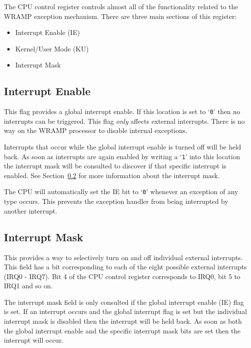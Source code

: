 \documentclass[a4paper,10pt]{article}
\begin{document}
The CPU control register controls almost all of the functionality
related to the WRAMP exception mechanism. There are three main
sections of this register:

\begin{itemize}
\item Interrupt Enable (IE)
\item Kernel/User Mode (KU)
\item Interrupt Mask
\end{itemize}

\subsection{Interrupt Enable}

This flag provides a global interrupt enable. If this location is set
to `\texttt{0}' then no interrupts can be triggered. This flag
\emph{only} affects external interrupts. There is no way on the WRAMP
processor to disable internal exceptions.

Interrupts that occur while the global interrupt enable is turned off
will be held back. As soon as interrupts are again enabled by writing
a `\texttt{1}' into this location the interrupt mask will be consulted
to discover if that specific interrupt is enabled. See
Section~\ref{sec:imask} for more information about the interrupt mask.

The CPU will automatically set the IE bit to `\texttt{0}' whenever an
exception of any type occurs. This prevents the exception handler
from being interrupted by another interrupt.

\subsection{Interrupt Mask}
\label{sec:imask}

This provides a way to selectively turn on and off individual external
interrupts. This field has a bit corresponding to each of the eight
possible external interrupts (IRQ0 - IRQ7). Bit 4 of the CPU control
register corresponds to IRQ0, bit 5 to IRQ1 and so on.

The interrupt mask field is only consulted if the global interrupt
enable (IE) flag is set. If an interrupt occurs and the global
interrupt flag is set but the individual interrupt mask is disabled
then the interrupt will be held back. As soon as both the global
interrupt enable and the specific interrupt mask bits are set then the
interrupt will occur.
\end{document}
